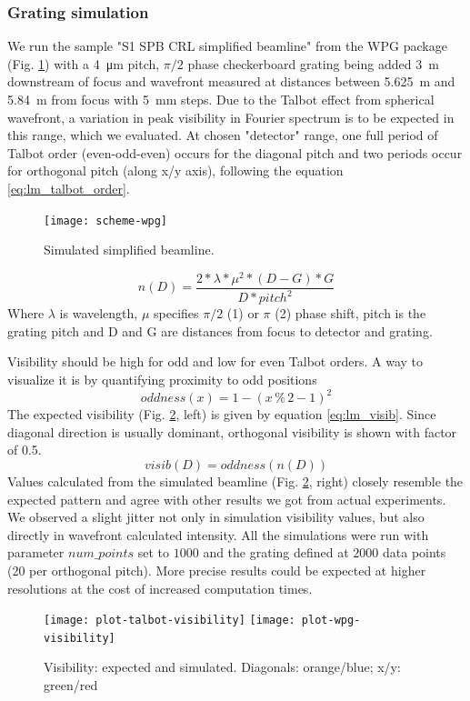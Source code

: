 \documentclass[10pt]{scrartcl}
\begin{document}
\subsubsection{Grating simulation}
We run the sample "S1 SPB CRL simplified beamline" from the WPG package (Fig.
\ref{fig:lm_wpg_beamline}) with a \SI{4}{\micro\meter} pitch, $\pi/2$ phase
checkerboard grating being added \SI{3}{\meter} downstream of focus and
wavefront measured at distances between \SI{5.625}{\meter} and \SI{5.84}{\meter}
from focus with \SI{5}{\milli\meter} steps. Due to the Talbot effect from
spherical wavefront, a variation in peak visibility in Fourier spectrum is to be
expected in this range, which we evaluated.  At chosen "detector" range, one
full period of Talbot order (even-odd-even) occurs for the diagonal pitch and
two periods occur for orthogonal pitch (along x/y axis), following the equation
\ref{eq:lm_talbot_order}.
%
\begin{figure}[ht]
	\begin{center}
		\texttt{[image: scheme-wpg]}
	\end{center}
	\caption{Simulated simplified beamline.}
	\label{fig:lm_wpg_beamline}
\end{figure}
%
\begin{equation}
n(D) = \frac{2* \lambda * \mu ^2 * (D-G) * G}{D * pitch ^2}
\label{eq:lm_talbot_order}
\end{equation}
Where $\lambda$ is wavelength, $\mu$ specifies $\pi/2$ (1) or $\pi$ (2) phase shift, pitch is the grating pitch and D and G are distances from focus to detector and grating.

Visibility should be high for odd and low for even Talbot orders. A way to visualize it is by quantifying proximity to odd positions%
%
\begin{equation*}
oddness(x) = 1-(x  \mathbin{\%}  2 - 1)^2
\end{equation*}
%
The expected visibility (Fig. \ref{fig:lm_visib}, left) is given by equation \ref{eq:lm_visib}. Since diagonal direction is usually dominant, orthogonal visibility is shown with factor of 0.5.
%
\begin{equation}
  visib(D) = oddness\left(n(D) \right)
  \label{eq:lm_visib}
\end{equation}
%
Values calculated from the simulated beamline (Fig. \ref{fig:lm_visib}, right) closely resemble the expected pattern and agree with other results we got from actual experiments.
We observed a slight jitter not only in simulation visibility values, but also directly in wavefront calculated intensity. All the simulations were run with parameter $num\_points$ set to $1000$ and the grating defined at $2000$ data points (20 per orthogonal pitch). More precise results could be expected at higher resolutions at the cost of increased computation times.
%
\begin{figure}[ht]
	\begin{center}
		\texttt{[image: plot-talbot-visibility]}
		\texttt{[image: plot-wpg-visibility]}
	\end{center}
	\caption{Visibility: expected and simulated. Diagonals: orange/blue; x/y: green/red}
	\label{fig:lm_visib}
\end{figure}
%
\FloatBarrier
%
\end{document}
